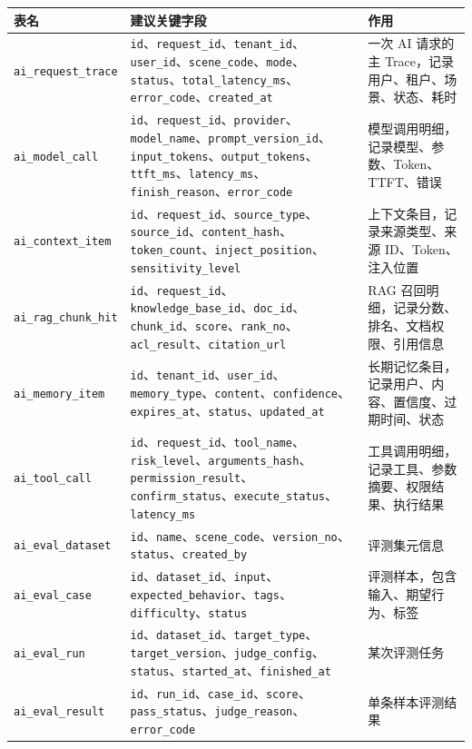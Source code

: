 \documentclass[9pt,a4paper,twocolumn]{ctexart}
\begin{document}
{\footnotesize
\begin{tabular}{|p{}|p{}|p{}|}
\hline
\textbf{表名} & \textbf{建议关键字段} & \textbf{作用} \\
\hline
\texttt{ai\_request\_trace} & \texttt{id}、\texttt{request\_id}、\texttt{tenant\_id}、\texttt{user\_id}、\texttt{scene\_code}、\texttt{mode}、\texttt{status}、\texttt{total\_latency\_ms}、\texttt{error\_code}、\texttt{created\_at} & 一次 AI 请求的主 Trace，记录用户、租户、场景、状态、耗时 \\
\hline
\texttt{ai\_model\_call} & \texttt{id}、\texttt{request\_id}、\texttt{provider}、\texttt{model\_name}、\texttt{prompt\_version\_id}、\texttt{input\_tokens}、\texttt{output\_tokens}、\texttt{ttft\_ms}、\texttt{latency\_ms}、\texttt{finish\_reason}、\texttt{error\_code} & 模型调用明细，记录模型、参数、Token、TTFT、错误 \\
\hline
\texttt{ai\_context\_item} & \texttt{id}、\texttt{request\_id}、\texttt{source\_type}、\texttt{source\_id}、\texttt{content\_hash}、\texttt{token\_count}、\texttt{inject\_position}、\texttt{sensitivity\_level} & 上下文条目，记录来源类型、来源 ID、Token、注入位置 \\
\hline
\texttt{ai\_rag\_chunk\_hit} & \texttt{id}、\texttt{request\_id}、\texttt{knowledge\_base\_id}、\texttt{doc\_id}、\texttt{chunk\_id}、\texttt{score}、\texttt{rank\_no}、\texttt{acl\_result}、\texttt{citation\_url} & RAG 召回明细，记录分数、排名、文档权限、引用信息 \\
\hline
\texttt{ai\_memory\_item} & \texttt{id}、\texttt{tenant\_id}、\texttt{user\_id}、\texttt{memory\_type}、\texttt{content}、\texttt{confidence}、\texttt{expires\_at}、\texttt{status}、\texttt{updated\_at} & 长期记忆条目，记录用户、内容、置信度、过期时间、状态 \\
\hline
\texttt{ai\_tool\_call} & \texttt{id}、\texttt{request\_id}、\texttt{tool\_name}、\texttt{risk\_level}、\texttt{arguments\_hash}、\texttt{permission\_result}、\texttt{confirm\_status}、\texttt{execute\_status}、\texttt{latency\_ms} & 工具调用明细，记录工具、参数摘要、权限结果、执行结果 \\
\hline
\texttt{ai\_eval\_dataset} & \texttt{id}、\texttt{name}、\texttt{scene\_code}、\texttt{version\_no}、\texttt{status}、\texttt{created\_by} & 评测集元信息 \\
\hline
\texttt{ai\_eval\_case} & \texttt{id}、\texttt{dataset\_id}、\texttt{input}、\texttt{expected\_behavior}、\texttt{tags}、\texttt{difficulty}、\texttt{status} & 评测样本，包含输入、期望行为、标签 \\
\hline
\texttt{ai\_eval\_run} & \texttt{id}、\texttt{dataset\_id}、\texttt{target\_type}、\texttt{target\_version}、\texttt{judge\_config}、\texttt{status}、\texttt{started\_at}、\texttt{finished\_at} & 某次评测任务 \\
\hline
\texttt{ai\_eval\_result} & \texttt{id}、\texttt{run\_id}、\texttt{case\_id}、\texttt{score}、\texttt{pass\_status}、\texttt{judge\_reason}、\texttt{error\_code} & 单条样本评测结果 \\
\hline
\end{tabular}
}
\end{document}
